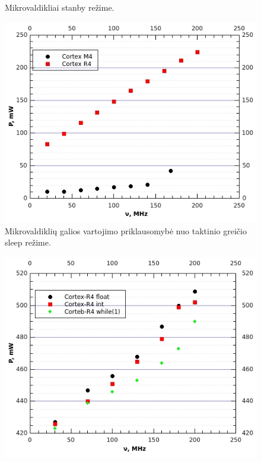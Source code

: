 \documentclass[a4paper, 12pt]{article} %
\begin{document}
\begin{onehalfspacing}
\begin{figure}[H]
\captionsetup{labelseparator=tarpas}
\caption{Mikrovaldikliai stanby re\v{z}ime.}
\label{vienas}
\end{figure}
\begin{figure}[H] %
\centering %
\includegraphics[scale=0.8]{pav/sleep.jpg} %
\captionsetup{labelformat=numbfirst} %
\captionsetup{labelseparator=tarpas}
\caption{Mikrovaldikli\k{u} galios vartojimo priklausomyb\.e nuo taktinio grei\v{c}io sleep re\v{z}ime.}
\label{vienas}
\end{figure}
\begin{figure}[H] %
\centering %
\includegraphics[scale=0.8]{pav/R4galia.jpg} %

\end{figure}
\end{onehalfspacing}
\end{document}
